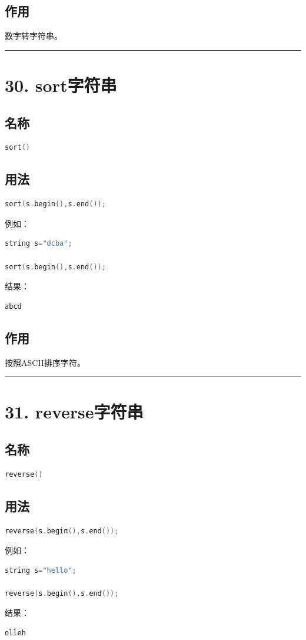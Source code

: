 \documentclass[9pt,twocolumn]{extarticle}
\begin{document}
\subsection{作用}
数字转字符串。

\noindent\rule{\linewidth}{0.4pt}

\section{30. sort字符串}

\subsection{名称}
\begin{lstlisting}[language=C++]
sort()
\end{lstlisting}

\subsection{用法}
\begin{lstlisting}[language=C++]
sort(s.begin(),s.end());
\end{lstlisting}
例如：
\begin{lstlisting}[language=C++]
string s="dcba";

sort(s.begin(),s.end());
\end{lstlisting}
结果：
\begin{lstlisting}
abcd
\end{lstlisting}

\subsection{作用}
按照ASCII排序字符。

\noindent\rule{\linewidth}{0.4pt}

\section{31. reverse字符串}

\subsection{名称}
\begin{lstlisting}[language=C++]
reverse()
\end{lstlisting}

\subsection{用法}
\begin{lstlisting}[language=C++]
reverse(s.begin(),s.end());
\end{lstlisting}
例如：
\begin{lstlisting}[language=C++]
string s="hello";

reverse(s.begin(),s.end());
\end{lstlisting}
结果：
\begin{lstlisting}
olleh
\end{lstlisting}
\end{document}
